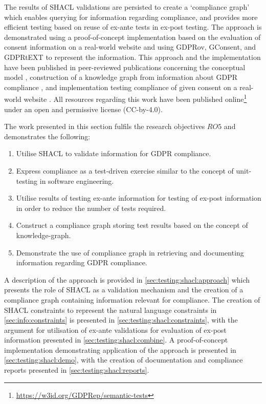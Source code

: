 The results of SHACL validations are persisted to create a `compliance graph' which enables querying for information regarding compliance, and provides more efficient testing based on reuse of ex-ante tests in ex-post testing.
The approach is demonstrated using a proof-of-concept implementation based on the evaluation of consent information on a real-world website and using GDPRov, GConsent, and GDPRtEXT to represent the information.
This approach and the implementation have been published in peer-reviewed publications concerning the conceptual model \cite{pandit_exploring_2018}, construction of a knowledge graph from information about GDPR compliance \cite{pandit_towards_2018}, and implementation testing compliance of given consent on a real-world website \cite{pandit_test-driven_2019}.
All resources regarding this work have been published online\footnote{\url{https://w3id.org/GDPRep/semantic-tests}} under an open and permissive license (CC-by-4.0).

The work presented in this section fulfils the research objectives $RO5$ and demonstrates the following:
\begin{enumerate}
    \item Utilise SHACL to validate information for GDPR compliance.
    \item Express compliance as a test-driven exercise similar to the concept of unit-testing in software engineering.
    \item Utilise results of testing ex-ante information for testing of ex-post information in order to reduce the number of tests required.
    \item Construct a compliance graph storing test results based on the concept of knowledge-graph.
    \item Demonstrate the use of compliance graph in retrieving and documenting information regarding GDPR compliance.
\end{enumerate}

A description of the approach is provided in \autoref{sec:testing:shacl:approach} which presents the role of SHACL as a validation mechanism and the creation of a compliance graph containing information relevant for compliance. The creation of SHACL constraints to represent the natural language constraints in \autoref{sec:info:constraints} is presented in \autoref{sec:testing:shacl:constraints}, with the argument for utilisation of ex-ante validations for evaluation of ex-post information presented in \autoref{sec:testing:shacl:combine}.
A proof-of-concept implementation demonstrating application of the approach is presented in \autoref{sec:testing:shacl:demo}, with the creation of documentation and compliance reports presented in \autoref{sec:testing:shacl:reports}.

